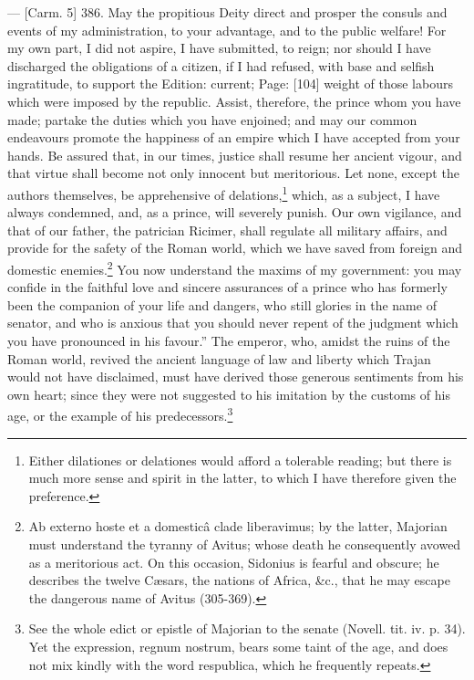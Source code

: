 {\texthebrew{—} [Carm. 5] 386.} May the propitious Deity direct and prosper the consuls and events of my administration, to your advantage, and to the public welfare! For my own part, I did not aspire, I have submitted, to reign; nor should I have discharged the obligations of a citizen, if I had refused, with base and selfish ingratitude, to support the Edition: current; Page: [104] weight of those labours which were imposed by the republic. Assist, therefore, the prince whom you have made; partake the duties which you have enjoined; and may our common endeavours promote the happiness of an empire which I have accepted from your hands. Be assured that, in our times, justice shall resume her ancient vigour, and that virtue shall become not only innocent but meritorious. Let none, except the authors themselves, be apprehensive of delations,\footnote{Either dilationes or delationes would afford a tolerable reading; but there is much more sense and spirit in the latter, to which I have therefore given the preference.} which, as a subject, I have always condemned, and, as a prince, will severely punish. Our own vigilance, and that of our father, the patrician Ricimer, shall regulate all military affairs, and provide for the safety of the Roman world, which we have saved from foreign and domestic enemies.\footnote{Ab externo hoste et a domesticâ clade liberavimus; by the latter, Majorian must understand the tyranny of Avitus; whose death he consequently avowed as a meritorious act. On this occasion, Sidonius is fearful and obscure; he describes the twelve Cæsars, the nations of Africa, \&c., that he may escape the dangerous name of Avitus (305-369).} You now understand the maxims of my government: you may confide in the faithful love and sincere assurances of a prince who has formerly been the companion of your life and dangers, who still glories in the name of senator, and who is anxious that you should never repent of the judgment which you have pronounced in his favour.\texthebrew{}” The emperor, who, amidst the ruins of the Roman world, revived the ancient language of law and liberty which Trajan would not have disclaimed, must have derived those generous sentiments from his own heart; since they were not suggested to his imitation by the customs of his age, or the example of his predecessors.\footnote{See the whole edict or epistle of Majorian to the senate (Novell. tit. iv. p. 34). Yet the expression, regnum nostrum, bears some taint of the age, and does not mix kindly with the word respublica, which he frequently repeats.}


